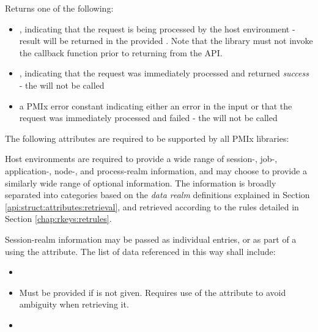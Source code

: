 Returns one of the following:

\begin{itemize}
    \item {}, indicating that the request is being processed by the host environment - result will be returned in the provided . Note that the library must not invoke the callback function prior to returning from the \ac{API}.
    \item {}, indicating that the request was immediately processed and returned \textit{success} - the  will not be called
    \item a PMIx error constant indicating either an error in the input or that the request was immediately processed and failed - the  will not be called
\end{itemize}

\reqattrstart
The following attributes are required to be supported by all \ac{PMIx} libraries:


\divider

Host environments are required to provide a wide range of session-, job-, application-, node-, and process-realm information, and may choose to provide a similarly wide range of optional information. The information is broadly separated into categories based on the \emph{data realm} definitions explained in Section \ref{api:struct:attributes:retrieval}, and retrieved according to the rules detailed in Section \ref{chap:rkeys:retrules}.

Session-realm information may be passed as individual  entries, or as part of a  using the  attribute. The list of data referenced in this way shall include:

\begin{itemize}
    \item {}
    \item {}Must be provided if  is not given. Requires use of the  attribute to avoid ambiguity when retrieving it.
    \pasteAttributeItemEnd
    \item {}
\end{itemize}

